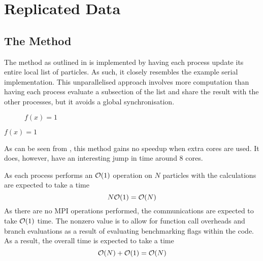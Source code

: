 \section{Replicated Data}
\label{sec:replicated_data_implementation}

%
%

\subsection{The \individualoperation{} Method}
\label{sec:replicated_data_individual_operation_implementation}

The \individualoperation{} method as outlined in
is implemented by having each process update
its entire local list of particles.
%
As such, it closely resembles the example serial implementation.
%
This unparallelised approach involves more computation than
having each process evaluate a subsection of the list and
share the result with the other processes,
but it avoids a global synchronisation.


%

%
%
\begin{figure}[!h]
    
    \caption{
        \vZeroSpeedupCaption
            {\replicateddata{}}
            {\individualoperation{}}
            {$f(x) = 1$}
    }
    \label{fig:v0_replicated_data_individual_operation_speedups}
\end{figure}


\vZeroSpeedupExplanation
    {}
    {\replicateddata{}}
    {\individualoperation{}}
    {$f(x) = 1$}

As can be seen from 
,
this method gains no speedup when extra cores are used.
%
It does, however, have an interesting jump in time around 8 cores.


%
As each process performs an $\mathcal{O}{\left({ 1 }\right)}$ operation on $N$ particles with
the calculations are expected to take a time
\begin{equation}
\label{eqn:v0_replicated_individual_operation_overall_time}
    N\mathcal{O}{\left({ 1 }\right)} = \mathcal{O}{\left({ N }\right)}
\end  {equation}
%
As there are no MPI operations performed, the communications are
expected to take $\mathcal{O}{\left({ 1 }\right)}$ time.
%
The nonzero value is to allow for function call overheads and
branch evaluations as a result of evaluating benchmarking flags
within the code.
%
As a result, the overall time is expected to take a time
\begin{equation}
    \mathcal{O}{\left({ N }\right)} + \mathcal{O}{\left({ 1 }\right)} = \mathcal{O}{\left({ N }\right)}
\end{equation}


